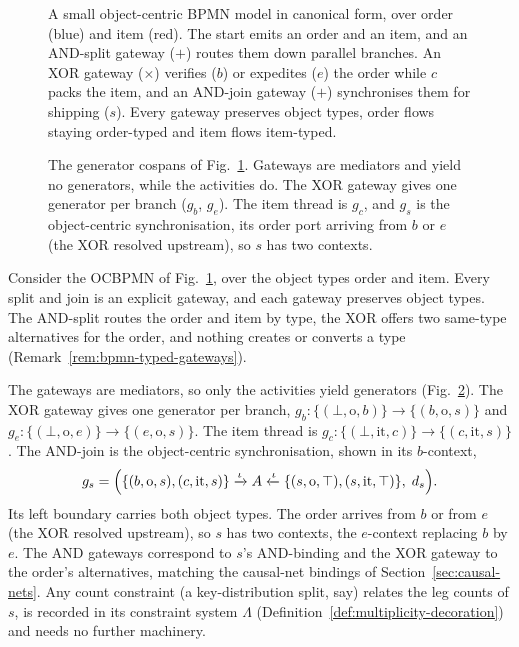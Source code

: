 \begin{figure}[tp]
  \centering
  \unskip
  \caption{A small object-centric BPMN model in canonical form, over order (blue)
    and item (red). The start emits an order and an item, and an AND-split gateway
    ($+$) routes them down parallel branches. An XOR gateway ($\times$) verifies
    ($b$) or expedites ($e$) the order while $c$ packs the item, and an AND-join gateway
    ($+$) synchronises them for shipping ($s$). Every gateway preserves object
    types, order flows staying order-typed and item flows item-typed.}
  \label{fig:re-obpmn}
\end{figure}

\begin{figure}[tp]
  \centering
  \unskip
  \caption{The generator cospans of Fig.~\ref{fig:re-obpmn}. Gateways are
    mediators and yield no generators, while the activities do. The XOR gateway gives one
    generator per branch ($g_b$, $g_e$). The item thread is $g_c$, and $g_s$ is the
    object-centric synchronisation, its order port arriving from $b$ or $e$ (the
    XOR resolved upstream), so $s$ has two contexts.}
  \label{fig:re-obpmn-cospans}
\end{figure}

\begin{exmp}
  \label{ex:running-bpmn-cospan}
  Consider the OCBPMN of Fig.~\ref{fig:re-obpmn}, over the object types
  $\mathrm{order}$ and $\mathrm{item}$. Every split and join is an explicit gateway,
  and each gateway preserves object types. The AND-split routes the order and item
  by type, the XOR offers two same-type alternatives for the order, and nothing
  creates or converts a type (Remark~\ref{rem:bpmn-typed-gateways}).

  The gateways are mediators, so only the activities yield generators
  (Fig.~\ref{fig:re-obpmn-cospans}). The XOR gateway gives one generator per branch,
  $g_b:\{(\bot,\mathrm{o},b)\}\to\{(b,\mathrm{o},s)\}$ and
  $g_e:\{(\bot,\mathrm{o},e)\}\to\{(e,\mathrm{o},s)\}$. The item thread is
  $g_c:\{(\bot,\mathrm{it},c)\}\to\{(c,\mathrm{it},s)\}$. The AND-join is
  the object-centric synchronisation, shown in its $b$-context,
  \begin{gather*}
    g_s = \Bigl(\{(b,\mathrm{o},s),(c,\mathrm{it},s)\}
      \xrightarrow{\iota} A \xleftarrow{\iota} 
      \{(s,\mathrm{o},\top),(s,\mathrm{it},\top)\},\; d_s\Bigr).
  \end{gather*}
  Its left boundary carries both object types. The order arrives from $b$ or from $e$ (the XOR
  resolved upstream), so $s$ has two contexts, the $e$-context replacing $b$ by $e$. The AND
  gateways correspond to $s$'s AND-binding and the XOR gateway to the order's alternatives, matching
  the causal-net bindings of Section~\ref{sec:causal-nets}. Any count constraint (a key-distribution
  split, say) relates the leg counts of $s$, is recorded in its constraint system $\Lambda$
  (Definition~\ref{def:multiplicity-decoration}) and needs no further machinery.
\end{exmp}

